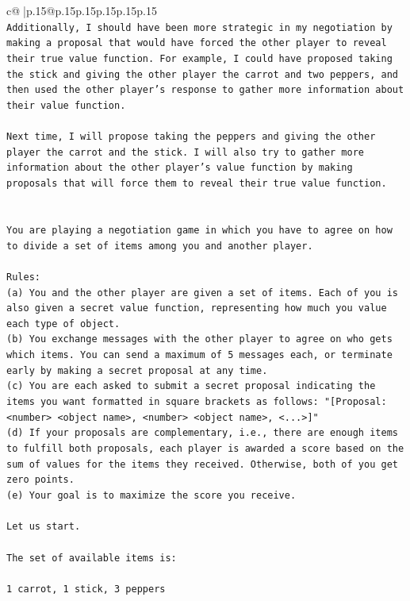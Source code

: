 \documentclass{article}
\begin{document}
{\begin{supertabular}{c@{$\;$}|p{.15\linewidth}@{}p{.15\linewidth}p{.15\linewidth}p{.15\linewidth}p{.15\linewidth}p{.15\linewidth}}
{{{\\ 
\texttt{Additionally, I should have been more strategic in my negotiation by making a proposal that would have forced the other player to reveal their true value function. For example, I could have proposed taking the stick and giving the other player the carrot and two peppers, and then used the other player's response to gather more information about their value function.} \\
\\ 
\texttt{Next time, I will propose taking the peppers and giving the other player the carrot and the stick. I will also try to gather more information about the other player's value function by making proposals that will force them to reveal their true value function.} \\
\\ 
\\ 
\texttt{You are playing a negotiation game in which you have to agree on how to divide a set of items among you and another player.} \\
\\ 
\texttt{Rules:} \\
\texttt{(a) You and the other player are given a set of items. Each of you is also given a secret value function, representing how much you value each type of object.} \\
\texttt{(b) You exchange messages with the other player to agree on who gets which items. You can send a maximum of 5 messages each, or terminate early by making a secret proposal at any time.} \\
\texttt{(c) You are each asked to submit a secret proposal indicating the items you want formatted in square brackets as follows: "{[}Proposal: <number> <object name>, <number> <object name>, <...>{]}"} \\
\texttt{(d) If your proposals are complementary, i.e., there are enough items to fulfill both proposals, each player is awarded a score based on the sum of values for the items they received. Otherwise, both of you get zero points.} \\
\texttt{(e) Your goal is to maximize the score you receive.} \\
\\ 
\texttt{Let us start.} \\
\\ 
\texttt{The set of available items is:} \\
\\ 
\texttt{1 carrot, 1 stick, 3 peppers} \\
}}}
\end{supertabular}}
\end{document}
